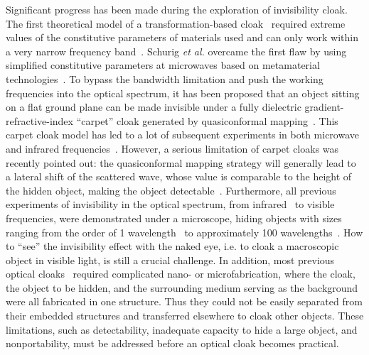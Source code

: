\documentclass[preprint,preprintnumbers,amsmath,amssymb]{revtex4}
\begin{document}
Significant progress has been made during the exploration of
invisibility cloak. The first theoretical model of a
transformation-based cloak~\cite{pendry} required extreme values of
the constitutive parameters of materials used and can only work
within a very narrow frequency band~\cite{pendry,baile_rainbow}.
Schurig \textit{et al.} overcame the  first flaw by using simplified
constitutive parameters at microwaves based on metamaterial
technologies~\cite{schurig}. To bypass the bandwidth limitation and
push the working frequencies into the optical spectrum, it has been
proposed that an object sitting on a flat ground plane can be made
invisible under a fully dielectric gradient-refractive-index
``carpet'' cloak generated by quasiconformal
mapping~\cite{li_carpet}. This carpet cloak model has led to a lot
of subsequent experiments in both microwave~\cite{ruopeng,huifeng}
and infrared frequencies~\cite{valentine,gabrielli,park,ergin}.
However, a serious limitation of carpet cloaks was recently pointed
out: the quasiconformal mapping strategy will generally lead to a
lateral shift of the scattered wave, whose value is comparable to
the height of the hidden object, making the object
detectable~\cite{baile_lateral_shift}. Furthermore, all previous
experiments of invisibility in the optical spectrum, from
infrared~\cite{valentine,gabrielli,park,ergin} to
visible~\cite{smolyaninov_SPP,smolyaninov_waveguide} frequencies,
were demonstrated under a microscope, hiding objects with sizes
ranging from the order of 1
wavelength~\cite{smolyaninov_SPP,valentine,gabrielli,park,ergin} to
approximately 100 wavelengths~\cite{smolyaninov_waveguide}. How to
``see'' the invisibility effect with the naked eye,  i.e. to cloak a
macroscopic object in visible light, is still a crucial challenge.
In addition, most previous optical
cloaks~\cite{smolyaninov_SPP,valentine,gabrielli,park,ergin}
required complicated nano- or microfabrication, where the cloak, the
object to be hidden, and the surrounding medium serving as the
background were all fabricated in one structure. Thus they could not
be easily separated from their embedded structures and transferred
elsewhere to cloak other objects. These limitations, such as
detectability, inadequate capacity to hide a large object, and
nonportability, must be addressed before an optical cloak becomes
practical.
\end{document}
